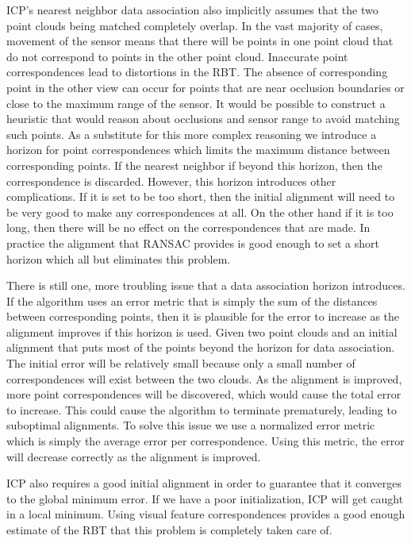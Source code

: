 \documentclass[letterpaper, 10pt, conference]{ieeeconf}
\begin{document}
	ICP's nearest neighbor data association also implicitly assumes that the two point clouds being matched completely overlap.  In the vast majority of cases, movement of the sensor means that there will be points in one point cloud that do not correspond to points in the other point cloud.  Inaccurate point correspondences lead to distortions in the RBT.  The absence of corresponding point in the other view can occur for points that are near occlusion boundaries or close to the maximum range of the sensor.  It would be possible to construct a heuristic that would reason about occlusions and sensor range to avoid matching such points.  As a substitute for this more complex reasoning we introduce a horizon for point correspondences which limits the maximum distance between corresponding points.   If the nearest neighbor if beyond this horizon, then the correspondence is discarded.  However, this horizon introduces other complications.  If it is set to be too short, then the initial alignment will need to be very good to make any correspondences at all.  On the other hand if it is too long, then there will be no effect on the correspondences that are made.  In practice the alignment that RANSAC provides is good enough  to set a short horizon which all but eliminates this problem.   

	There is still one, more troubling issue that a data association horizon introduces.  If the algorithm uses an error metric that is simply the sum of the distances between corresponding points, then it is plausible for the error to increase as the alignment improves if this horizon is used.  Given two point clouds and an initial alignment that puts most of the points beyond the horizon for data association.  The initial error will be relatively small because only a small number of correspondences will exist between the two clouds.  As the alignment is improved, more point correspondences will be discovered, which would cause the total error to increase.  This could cause the algorithm to terminate prematurely, leading to suboptimal alignments.  To solve this issue we use a normalized error metric which is simply the average error per correspondence.  Using this metric, the error will decrease correctly as the alignment is improved.   

	ICP also requires a good initial alignment in order to guarantee that it converges to the global minimum error.  If we have a poor initialization, ICP will get caught in a local minimum.  Using visual feature correspondences provides a good enough estimate of the RBT that this problem is completely taken care of. 
 
\end{document}
